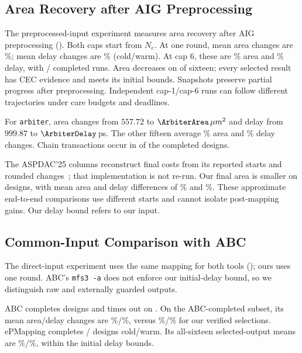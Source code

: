 \subsection{Area Recovery after AIG Preprocessing}\label{sec:aspdac}

The preprocessed-input experiment measures area recovery after AIG preprocessing (). Both caps start from $N_e$. At one round, mean area changes are \OwnOneArea\%; mean delay changes are \OwnOneDelay\% (cold/warm). At cap 6, these are \OwnArea\% area and \OwnDelay\% delay, with \ColdMainCompleted{}/\WarmMainCompleted{} completed runs. Area decreases on \OwnAreaWins{} of sixteen; every selected result has CEC evidence and meets its initial bounds. Snapshots preserve partial progress after preprocessing. Independent cap-1/cap-6 runs can follow different trajectories under care budgets and deadlines.

For \texttt{arbiter}, area changes from $557.72$ to $\ArbiterArea\,\mu m^2$ and delay from $999.87$ to $\ArbiterDelay$\,ps. The other fifteen average \mbox{\OwnOtherArea\%} area and \mbox{\OwnOtherDelay\%} delay changes. Chain transactions occur in \ChainAreaWins{} of the completed designs. 



The ASPDAC'25 columns reconstruct final costs from its reported starts and rounded changes~\cite{aspdac25}; that implementation is not re-run. Our final area is smaller on \MainWins{} designs, with mean area and delay differences of \mbox{\MainAreaAll\%} and \mbox{\MainDelayAll\%}. These approximate end-to-end comparisons use different starts and cannot isolate post-mapping gains. Our delay bound refers to our input.

\subsection{Common-Input Comparison with ABC}\label{sec:mfs3}
The direct-input experiment uses the same mapping for both tools (); ours uses one round. ABC's \texttt{mfs3 -a} does not enforce our initial-delay bound, so we distinguish raw and externally guarded outputs.

ABC completes \ABCCompleted{} designs and times out on \ABCTimeouts{}. On the ABC-completed subset, its mean area/delay changes are \mbox{\ABCArea\%}/\mbox{\ABCDelay\%}, versus \mbox{\PairedOwnArea\%}/\mbox{\PairedOwnDelay\%} for our verified selections. ePMapping completes \ColdMfsCompleted{}/\WarmMfsCompleted{} designs cold/warm. Its all-sixteen selected-output means are \mbox{\MfsOwnArea\%}/\mbox{\MfsOwnDelay\%}, within the initial delay bounds.


